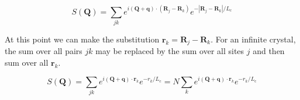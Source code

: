 \documentclass[11pt,letter]{article}
\newcommand{\bv}[1]{\ensuremath{\bm{#1}}}
\newcommand{\Lc}{\ensuremath{L_{\mathrm{c}}}}
\begin{document}
\begin{equation}
S(\bv{Q}) = \sum_{jk} e^{i (\bv{Q} + \bv{q} )\cdot (\bv{R}_{j} - \bv{R}_{k} )} e^{-|\bv{R}_{j} -\bv{R}_{k} |/ \Lc }
\end{equation}

At this point we can make the substitution $\bv{r}_{k} = \bv{R}_{j} -
\bv{R}_{k}$.  For an infinite crystal, the sum over all pairs $jk$ may be replaced by the sum over all
sites $j$ and then sum over all $\bv{r}_{k}$. 

\begin{equation}
S(\bv{Q}) = \sum_{jk} e^{i (\bv{Q} + \bv{q} )\cdot \bv{r}_{k} } e^{-r_{k}/ \Lc } = N \sum_{k} e^{i (\bv{Q} + \bv{q} )\cdot \bv{r}_{k} } e^{-r_{k}/ \Lc }
\end{equation}



\end{document}
